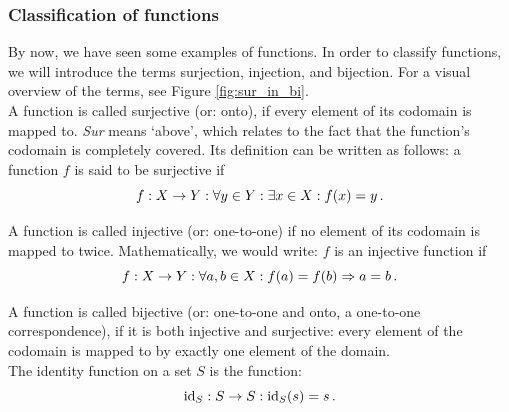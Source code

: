     \subsubsection{Classification of functions}
        By now, we have seen some examples of functions. In order to classify functions, we will introduce the terms surjection, injection, and bijection. For a visual overview of the terms, see Figure \ref{fig:sur_in_bi}. \\

        A function is called surjective (or: onto), if every element of its codomain is mapped to. \emph{Sur} means `above', which relates to the fact that the function's codomain is completely covered. Its definition can be written as follows: a function $f$ is said to be surjective if
        \begin{equation}
            f: X \rightarrow Y: \forall y \in Y: \exists x \in X: f(x) = y \thinspace .
        \end{equation}

        A function is called injective (or: one-to-one) if no element of its codomain is mapped to twice. Mathematically, we would write: $f$ is an injective function if
        \begin{equation}
            f: X \rightarrow Y: \forall a, b \in X: f(a) = f(b) \Rightarrow a = b \thinspace .
        \end{equation}

        A function is called bijective (or: one-to-one and onto, a one-to-one correspondence), if it is both injective and surjective: every element of the codomain is mapped to by exactly one element of the domain. \\

        The identity function on a set $S$ is the function:
        \begin{equation}
            \operatorname{id}_S: S \rightarrow S: \operatorname{id}_S(s) = s \thinspace .
        \end{equation}

